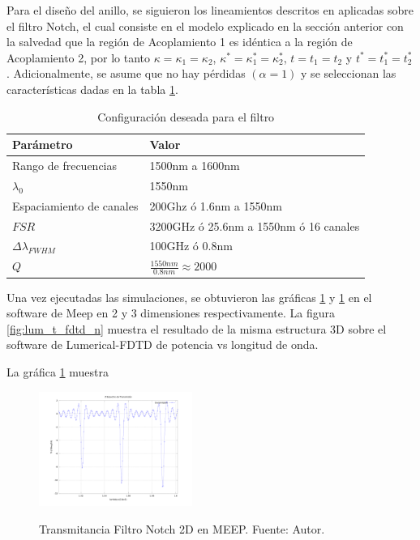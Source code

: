 \documentclass{IEEEtran}
\begin{document}
Para el diseño del anillo, se siguieron los lineamientos descritos en \cite{Lumerical2009}
aplicadas sobre el filtro Notch, el cual consiste en
el modelo explicado en la sección anterior con la salvedad que 
la región de Acoplamiento 1 es idéntica a la región de Acoplamiento 2, por lo tanto
$\kappa = \kappa_1 = \kappa_2$, 
$\kappa^* = \kappa_1^* = \kappa_2^*$, 
$t=t_1 = t_2$ y 
$t^*=t_1^* = t_2^*$. 
Adicionalmente, se asume que no hay pérdidas $(\alpha=1)$ y
se seleccionan las características dadas en la tabla \ref{tb:lum_params}.

\begin{table}[H]
\centering
\begin{tabular}{|l|l|}
\hline
Parámetro & Valor \\
\hline
Rango de frecuencias & 1500nm a 1600nm \\ 
$\lambda_0$ & 1550nm \\
Espaciamiento de canales & 200Ghz ó 1.6nm a 1550nm \\
$FSR$ & 3200GHz ó 25.6nm a 1550nm ó 16 canales \\
$\Delta \lambda_{FWHM}$ & 100GHz ó 0.8nm \\
$Q$ & $\frac{1550nm}{0.8nm} \approx 2000$ \\
\hline
\end{tabular}
\caption{Configuración deseada para el filtro}
\label{tb:lum_params}
\end{table} 


Una vez ejecutadas las simulaciones, se obtuvieron las gráficas \ref{fig:meep_res_n} y 
\ref{fig:meep_res_n} en el software de Meep en 2 y 3 dimensiones respectivamente. 
La figura \ref{fig:lum_t_fdtd_n} muestra el resultado de la misma estructura 3D sobre el 
software de Lumerical-FDTD de potencia vs longitud de onda.

La gráfica \ref{fig:meep_res_n} muestra 
\begin{figure}
\caption{Transmitancia Filtro Notch 2D en MEEP. Fuente: Autor.}
\centering
\includegraphics[width=5cm,natwidth=1200,natheight=900]{figs/gausrc_flux_mod-graph_res80.png}
\label{fig:meep_res_n}
\end{figure}
\end{document}
